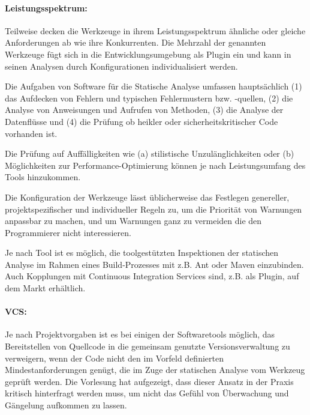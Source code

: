 \paragraph{Leistungsspektrum:} Teilweise decken die Werkzeuge in ihrem Leistungsspektrum ähnliche oder gleiche Anforderungen ab wie ihre Konkurrenten. Die Mehrzahl der genannten Werkzeuge fügt sich in die Entwicklungsumgebung als Plugin ein und kann in seinen Analysen durch Konfigurationen individualisiert werden. 

Die Aufgaben von Software für die Statische Analyse umfassen hauptsächlich (1) das Aufdecken von Fehlern und typischen Fehlermustern bzw. -quellen, (2) die Analyse von Anweisungen und Aufrufen von Methoden, (3) die Analyse der Datenflüsse und (4) die Prüfung ob heikler oder sicherheitskritischer Code vorhanden ist. 

Die Prüfung auf Auffälligkeiten wie (a) stilistische Unzulänglichkeiten oder (b) Möglichkeiten zur Performance-Optimierung können je nach Leistungsumfang des Tools hinzukommen.

Die Konfiguration der Werkzeuge lässt üblicherweise das Festlegen genereller, projektspezifischer und individueller Regeln zu,   um die Priorität von Warnungen anpassbar zu machen, und um Warnungen ganz zu vermeiden die den Programmierer nicht interessieren.

Je nach Tool ist es möglich, die toolgestützten Inspektionen der statischen Analyse im Rahmen eines Build-Prozesses mit z.B. Ant oder Maven einzubinden. Auch Kopplungen mit Continuous Integration Services sind, z.B. als Plugin, auf dem Markt erhältlich.

\paragraph{VCS:} Je nach Projektvorgaben ist es bei einigen der Softwaretools möglich, das Bereitstellen von Quellcode in die gemeinsam genutzte Versionsverwaltung zu verweigern, wenn der Code nicht den im Vorfeld definierten Mindestanforderungen genügt, die im Zuge der statischen Analyse vom Werkzeug geprüft werden. Die Vorlesung hat aufgezeigt, dass dieser Ansatz in der Praxis kritisch hinterfragt werden muss, um nicht das Gefühl von Überwachung und Gängelung aufkommen zu lassen.
